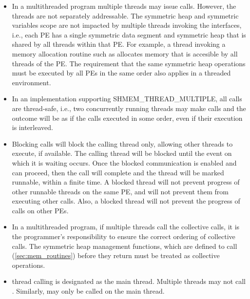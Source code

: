 \begin{itemize}[leftmargin=*]

\item
In a multithreaded \openshmem{} program multiple threads may issue \openshmem{}
calls. However, the threads are not separately addressable. The symmetric heap and symmetric variables scope
are not impacted by multiple threads invoking the
\openshmem{} interfaces, i.e., 
each \ac{PE} has a single symmetric data segment and symmetric heap that is shared by
all threads within that \ac{PE}.  For example, a thread invoking a memory allocation
routine such as  
allocates memory that is accesible by all threads of the \ac{PE}. 
The requirement that the same symmetric heap operations must
be executed by all \acp{PE} in the same order also applies in a threaded
environment. 
                                    	
\item In an \openshmem{} implementation supporting SHMEM\_THREAD\_MULTIPLE, 
all \openshmem{} calls are thread-safe, i.e., two concurrently running threads
may make \openshmem{} calls and the outcome will be as if the calls executed in
some order, even if their execution is interleaved.

\item Blocking \openshmem{} calls will block the calling thread only, allowing
other threads to execute, if available. The calling thread will be blocked until the
event on which it is waiting occurs. Once the blocked communication is enabled
and can proceed, then the call will complete and the thread will be marked
runnable, within a finite time. A blocked thread will not prevent progress of
other runnable threads on the same \ac{PE}, and will not prevent them from
executing other \openshmem{} calls. Also, a blocked thread will not prevent the
progress of \openshmem{} calls on other \acp{PE}. 
 
\item
In a multithreaded \openshmem{} program, if multiple threads call the collective
calls, it is the programmer's responsibility to ensure the correct ordering of
collective calls.  The symmetric heap management functions, which are defined to call
(\ref{sec:mem_routines}) before they return 
must be treated as collective operations.

\item
\openshmem{} thread calling  is designated as the main
thread. Multiple threads may not call . Similarly,
 may only be called on the main thread.

\end{itemize} 
 
